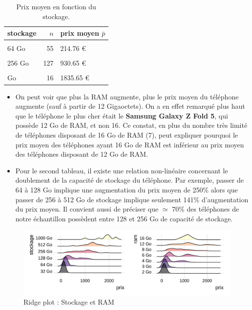 \documentclass[
  12pt,
]{report}
\begin{document}
\begin{table}[!h]
\centering
\caption{\label{tab:kable_2}Prix moyen en fonction du stockage.}
\centering
\begin{tabular}[t]{lrl}
\toprule
\textbf{stockage} & \textbf{$n$} & \textbf{prix moyen $\bar p$}\\
\midrule
\cellcolor{gray!10}{32 Go} & \cellcolor{gray!10}{27} & \cellcolor{gray!10}{116.65 €}\\
64 Go & 55 & 214.76 €\\
\cellcolor{gray!10}{128 Go} & \cellcolor{gray!10}{207} & \cellcolor{gray!10}{537.44 €}\\
256 Go & 127 & 930.65 €\\
\cellcolor{gray!10}{512 Go} & \cellcolor{gray!10}{55} & \cellcolor{gray!10}{1318.86 €}\\
\addlinespace
1000 Go & 16 & 1835.65 €\\
\bottomrule
\end{tabular}
\end{table}

\begin{itemize}
\item
  On peut voir que plus la RAM augmente, plus le prix moyen du téléphone
  augmente (sauf à partir de 12 Gigaoctets). On a en effet remarqué plus
  haut que le téléphone le plus cher était le \textbf{Samsung Galaxy Z
  Fold 5}, qui possède 12 Go de RAM, et non 16. Ce constat, en plus du
  nombre très limité de téléphones disposant de 16 Go de RAM (7), peut
  expliquer pourquoi le prix moyen des téléphones ayant 16 Go de RAM est
  inférieur au prix moyen des téléphones disposant de 12 Go de RAM.
\item
  Pour le second tableau, il existe une relation non-linéaire concernant
  le doublement de la capacité de stockage du téléphone. Par exemple,
  passer de 64 à 128 Go implique une augmentation du prix moyen de 250\%
  alors que passer de 256 à 512 Go de stockage implique seulement 141\%
  d'augmentation du prix moyen. Il convient aussi de préciser que
  \(\simeq\) 70\% des téléphones de notre échantillon possèdent entre
  128 et 256 Go de capacité de stockage.
\end{itemize}

\begin{figure}[H]

{\centering \includegraphics{report_files/figure-pdf/ggplots-1.pdf}

}

\caption{Ridge plot : Stockage et RAM}

\end{figure}%
\end{document}
